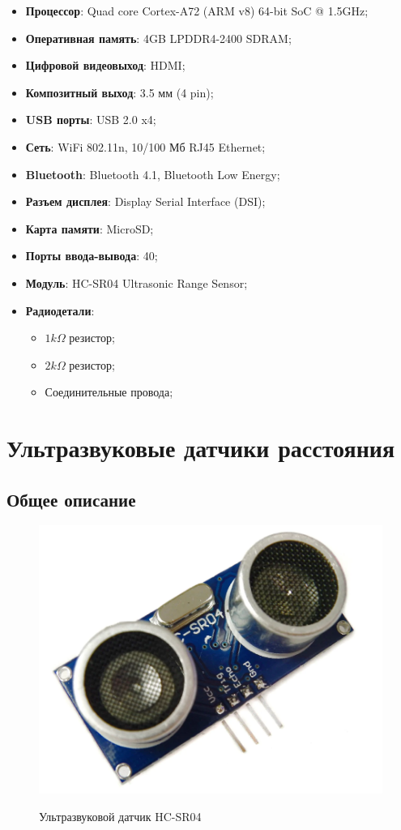 \documentclass[a4paper, 14pt]{article}
\begin{document}
\begin{itemize}
	\item \textbf{Процессор}: Quad core Cortex-A72 (ARM v8) 64-bit SoC @ 1.5GHz;
	\item \textbf{Оперативная память}: 4GB LPDDR4-2400 SDRAM;
	\item \textbf{Цифровой видеовыход}: HDMI;
	\item \textbf{Композитный выход}: 3.5 мм (4 pin);
	\item \textbf{USB порты}: USB 2.0 x4;
	\item \textbf{Сеть}: WiFi 802.11n, 10/100 Мб RJ45 Ethernet;
	\item \textbf{Bluetooth}: Bluetooth 4.1, Bluetooth Low Energy;
	\item \textbf{Разъем дисплея}: Display Serial Interface (DSI);
	\item \textbf{Карта памяти}: MicroSD;
	\item \textbf{Порты ввода-вывода}: 40;
	\item \textbf{Модуль}: HC-SR04 Ultrasonic Range Sensor;
	\item \textbf{Радиодетали}:
	      \begin{itemize}
		      \item $1k\Omega$ резистор;
		      \item $2k\Omega$ резистор;
		      \item Соединительные провода;
	      \end{itemize}
\end{itemize}

\newpage
\section{Ультразвуковые датчики расстояния}

\subsection{Общее описание}

\begin{figure}[H]
	\centering
	\includegraphics[width=15cm]{screenshots/1.png}\\
	\caption{Ультразвуковой датчик HC-SR04}
\end{figure}
\end{document}
